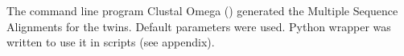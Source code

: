 The command line program Clustal Omega (\cite{sievers2014}) generated the Multiple Sequence Alignments for the twins.
Default parameters were used.
Python wrapper was written to use it in scripts (see appendix).
